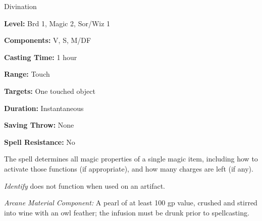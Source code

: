
Divination

\textbf{Level:} Brd 1, Magic 2, Sor/Wiz 1

\textbf{Components:} V, S, M/DF

\textbf{Casting Time:} 1 hour

\textbf{Range:} Touch

\textbf{Targets:} One touched object

\textbf{Duration:} Instantaneous

\textbf{Saving Throw:} None

\textbf{Spell Resistance:} No

The spell determines all magic properties of a single magic item, including how 
to activate those functions (if appropriate), and how many charges are left (if 
any).

\textit{Identify} does not function when used on an artifact.

\textit{Arcane Material Component:} A pearl of at least 100 gp value, crushed and 
stirred into wine with an owl feather; the infusion must be drunk prior to spellcasting.

